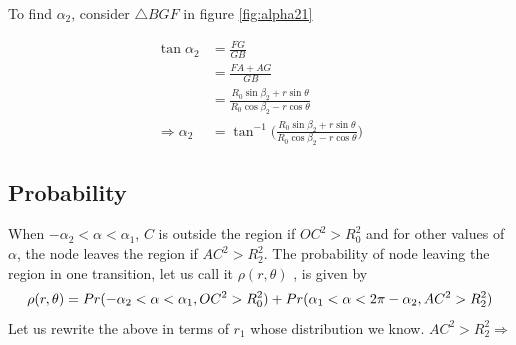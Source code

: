 To find $\alpha_2$, consider $\bigtriangleup BGF$ in figure \ref{fig:alpha21}

\begin{align*}
	\tan\alpha_2 &= \frac{FG}{GB} \\[2ex]
			  &= \frac{FA+AG}{GB} \\[2ex]
			  &= \frac{R_0 \sin\beta_2 + r\sin\theta}{R_0 \cos\beta_2 - r\cos\theta} \\[2ex]
\Rightarrow \alpha_2 &= \tan^{-1}\bigg( \frac{R_0 \sin\beta_2 + r\sin\theta}{R_0 \cos\beta_2 - r\cos\theta} \bigg) 
\end{align*}

\subsection{Probability}
When $-\alpha_2 < \alpha < \alpha_1$, $C$ is outside the region if $OC^2 > R_0^2$ and for other values of $\alpha$, the node leaves the region if $AC^2 > R_2^2$. The probability of node leaving the region in one transition, let us call it $\rho(r,\theta)$
, is given by
\begin{equation}\label{eq:prob1}
	\rho(r,\theta) = Pr(-\alpha_2 < \alpha < \alpha_1,OC^2 > R_0^2) + Pr(\alpha_1 < \alpha < 2\pi-\alpha_2, AC^2 > R_2^2) \\
\end{equation}
Let us rewrite the above in terms of $r_1$ whose distribution we know.
$AC^2 > R_2^2 \Rightarrow$

